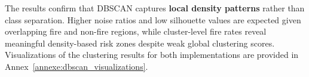 The results confirm that DBSCAN captures \textbf{local density patterns} rather than class separation. Higher noise ratios and low silhouette values are expected given overlapping fire and non-fire regions, while cluster-level fire rates reveal meaningful density-based risk zones despite weak global clustering scores.
Visualizations of the clustering results for both implementations are provided in Annex~\ref{annexe:dbscan_visualizations}.